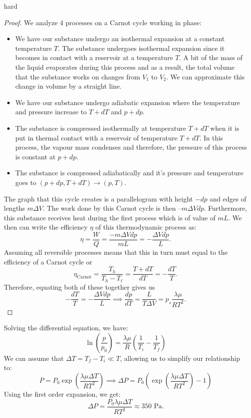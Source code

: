 \begin{solution}{hard}
\begin{proof}
We analyze 4 processes on a Carnot cycle working in phase:
\begin{itemize}
    \item We have our substance undergo an isothermal expansion at a constant temperature $T$. The substance undergoes isothermal expansion since it becomes in contact with a reservoir at a temperature $T$. A bit of the mass of the liquid evaporates during this process and as a result, the total volume that the substance works on changes from $V_1$ to $V_2$. We can approximate this change in volume by a straight line.
    \item We have our substance undergo adiabatic expansion where the temperature and pressure increase to $T + dT$ and $p + dp$.
    \item The substance is compressed isothermally at temperature $T + dT$ when it is put in thermal contact with a reservoir of temperature $T + dT$. In this process, the vapour mass condenses and therefore, the pressure of this process is constant at $p + dp$.
    \item The substance is compressed adiabatically and it's pressure and temperature goes to $(p + dp, T + dT)\to (p, T)$.
\end{itemize}
The graph that this cycle creates is a parallelogram with height $-dp$ and edges of lengths $m \Delta V$. The work done by this Carnot cycle is then $–m\Delta V dp$. Furthermore, this substance receives heat during the first process which is of value of $mL$. We then can write the efficiency $\eta$ of this thermodynamic process as:
\[\eta = \frac{W}{Q} = \frac{-m\Delta V dp}{mL} = -\frac{\Delta V dp}{L}.\]
Assuming all reversible processes means that this in turn must equal to the efficiency of a Carnot cycle or
\[\eta_{\text{Carnot}} = \frac{T_h}{T_h - T_{\ell}} = \frac{T + dT}{dT} = - \frac{dT}{T}.\]
Therefore, equating both of these together gives us 
\[- \frac{dT}{T} = -\frac{\Delta V dp}{L} \implies \frac{dp}{dT} = \frac{L}{T \Delta V} = p_s \frac{\lambda \mu}{RT^2}.\]
\end{proof}
Solving the differential equation, we have:
$$\ln\left(\frac{p}{p_0}\right)=\frac{\lambda \mu}{R}\left(\frac{1}{T_i}-\frac{1}{T_f}\right)$$
We can assume that $\Delta T = T_f-T_i \ll T$, allowing us to simplify our relationship to:
$$P=P_0\exp\left(\frac{\lambda\mu\Delta T}{RT^2}\right) \implies \Delta P = P_0\left(\exp\left(\frac{\lambda\mu\Delta T}{RT^2}\right)-1\right)$$
Using the first order expansion, we get:
$$\Delta P=\frac{P_0\lambda\mu\Delta T}{RT^2}\approx 350 \text{ Pa.}$$


\end{solution}
